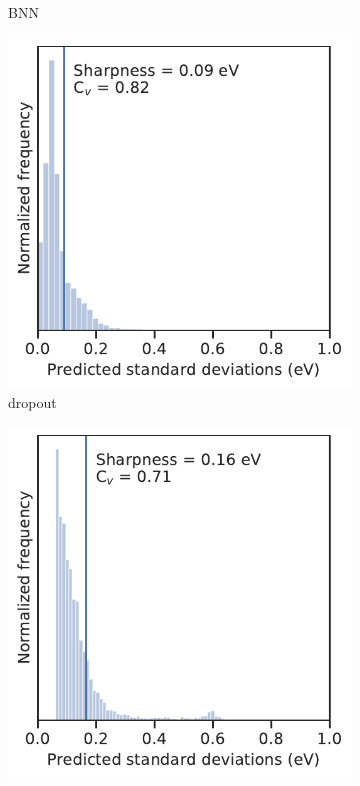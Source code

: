 \documentclass[]{achemso}
\begin{document}
\begin{figure}
\begin{subfigure}{0.32\textwidth}
        \caption{\gls{BNN}}\label{fig:sharpness_bnn}
    \end{subfigure}
    \begin{subfigure}{0.32\textwidth}
        \includegraphics[width=\textwidth]{../dropout/sharpness.pdf}
        \caption{\gls{dropout}}\label{fig:sharpness_dropout}
    \end{subfigure}
    \begin{subfigure}{0.32\textwidth}
        \includegraphics[width=\textwidth]{../NNdNN/sharpness.pdf}

\end{subfigure}
\end{figure}
\end{document}
